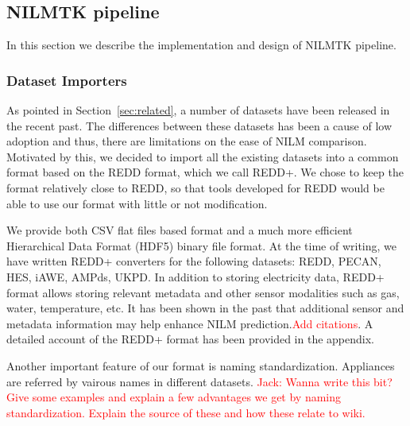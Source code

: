 \documentclass{sig-alternate}
\newcommand{\redcolor}[1]{\textcolor{red}{#1}}
\newcommand{\secref}[1]{Section~\ref{#1}}
\begin{document}
\subsection{NILMTK pipeline}
In this section we describe the implementation and design of NILMTK pipeline. 
\subsubsection{Dataset Importers} As pointed in \secref{sec:related}, a number of datasets have been released in the recent past. The differences between these datasets has been a cause of low adoption and thus, there are limitations on the ease of NILM comparison. Motivated by this, we decided to import all the existing datasets into a common format based on the REDD format, which we call REDD+. We chose to keep the format relatively close to REDD, so that tools developed for REDD would be able to use our format with little or not modification. 

We provide both CSV flat files based format and a much more efficient Hierarchical Data Format (HDF5) binary file format. At the time of writing, we have written REDD+ converters for the following datasets: REDD, PECAN, HES, iAWE, AMPds, UKPD. In addition to storing electricity data, REDD+ format allows storing relevant metadata and other sensor modalities such as gas, water, temperature, etc. It has been shown in the past that additional sensor and metadata information may help enhance NILM prediction.\redcolor{Add citations}. A detailed account of the REDD+ format has been provided in the appendix. 

Another important feature of our format is naming standardization. Appliances are referred by vairous names in different datasets. \redcolor{Jack: Wanna write this bit? Give some examples and explain a few advantages we get by naming standardization. Explain the source of these and how these relate to wiki. 
}
\end{document}
